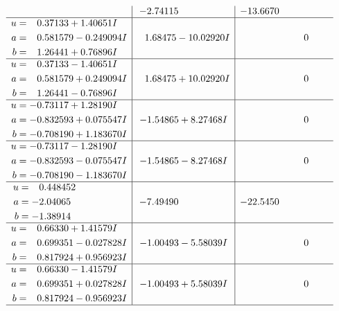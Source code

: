 \documentclass[1p]{elsarticle_modified}
\theoremstyle{definition}
\begin{document}
$$\begin{array}{c|c|c}
 & -2.74115\phantom{ +0.000000I} & -13.6670\phantom{ +0.000000I} \\ \hline\begin{aligned}
u &= \phantom{-}0.37133 + 1.40651 I \\
a &= \phantom{-}0.581579 - 0.249094 I \\
b &= \phantom{-}1.26441 + 0.76896 I\end{aligned}
 & \phantom{-}1.68475 - 10.02920 I & \phantom{-0.000000 } 0 \\ \hline\begin{aligned}
u &= \phantom{-}0.37133 - 1.40651 I \\
a &= \phantom{-}0.581579 + 0.249094 I \\
b &= \phantom{-}1.26441 - 0.76896 I\end{aligned}
 & \phantom{-}1.68475 + 10.02920 I & \phantom{-0.000000 } 0 \\ \hline\begin{aligned}
u &= -0.73117 + 1.28190 I \\
a &= -0.832593 + 0.075547 I \\
b &= -0.708190 + 1.183670 I\end{aligned}
 & -1.54865 + 8.27468 I & \phantom{-0.000000 } 0 \\ \hline\begin{aligned}
u &= -0.73117 - 1.28190 I \\
a &= -0.832593 - 0.075547 I \\
b &= -0.708190 - 1.183670 I\end{aligned}
 & -1.54865 - 8.27468 I & \phantom{-0.000000 } 0 \\ \hline\begin{aligned}
u &= \phantom{-}0.448452\phantom{ +0.000000I} \\
a &= -2.04065\phantom{ +0.000000I} \\
b &= -1.38914\phantom{ +0.000000I}\end{aligned}
 & -7.49490\phantom{ +0.000000I} & -22.5450\phantom{ +0.000000I} \\ \hline\begin{aligned}
u &= \phantom{-}0.66330 + 1.41579 I \\
a &= \phantom{-}0.699351 - 0.027828 I \\
b &= \phantom{-}0.817924 + 0.956923 I\end{aligned}
 & -1.00493 - 5.58039 I & \phantom{-0.000000 } 0 \\ \hline\begin{aligned}
u &= \phantom{-}0.66330 - 1.41579 I \\
a &= \phantom{-}0.699351 + 0.027828 I \\
b &= \phantom{-}0.817924 - 0.956923 I\end{aligned}
 & -1.00493 + 5.58039 I & \phantom{-0.000000 } 0\\
 \hline 
 \end{array}$$\newpage
\end{document}
